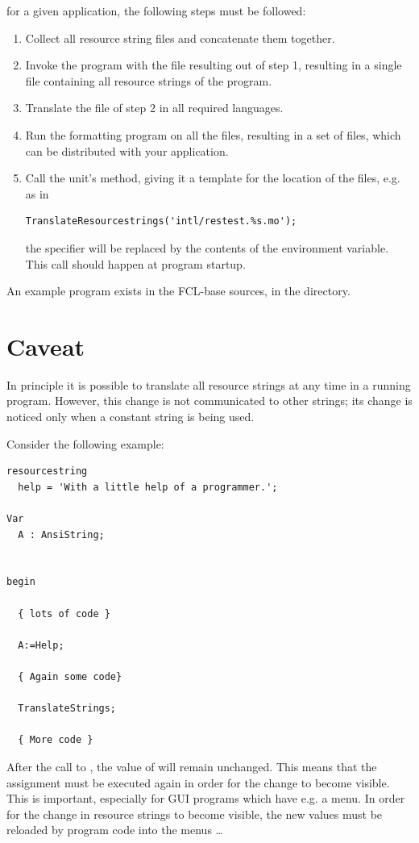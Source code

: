 for a given application, the following steps must be followed:
\begin{enumerate}
\item Collect all resource string files and concatenate them together.
\item Invoke the  program with the file resulting out of step
1, resulting in a single  file containing all resource strings of
the program.
\item Translate the  file of step 2 in all required languages.
\item Run the  formatting program on all the  files,
resulting in a set of  files, which can be distributed with your
application.
\item Call the  unit's  method,
giving it a template for the location of the  files, e.g. as in
\begin{verbatim}
TranslateResourcestrings('intl/restest.%s.mo');
\end{verbatim}
the  specifier will be replaced by the contents of the 
environment variable. This call should happen at program startup.
\end{enumerate}
An example program  exists in the FCL-base sources, in the 
directory.
\section{Caveat}
In principle it is possible to translate all resource strings at any time in
a running program. However, this change is not communicated to other
strings; its change is noticed only when a constant string is being used.

Consider the following example:
\begin{verbatim}
resourcestring
  help = 'With a little help of a programmer.';

Var
  A : AnsiString;


begin

  { lots of code }

  A:=Help;

  { Again some code}

  TranslateStrings;

  { More code }
\end{verbatim}
After the call to , the value of  will remain
unchanged. This means that the assignment  must be executed
again in order for the change to become visible. This is important,
especially for GUI programs which have e.g. a menu. In order for the
change in resource strings to become visible, the new values must be
reloaded by program code into the menus \dots

